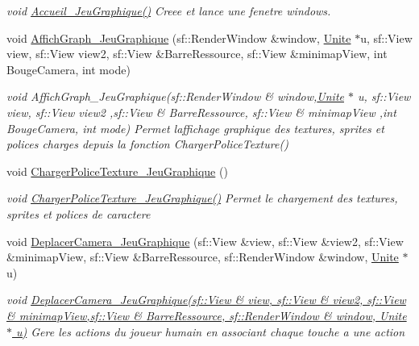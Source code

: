 \begin{DoxyCompactItemize}
\begin{DoxyCompactList}\small\item\em void \hyperlink{classJeu__graphique_a42894aac7cd7b37efe13ded6f47586de}{Accueil\+\_\+\+Jeu\+Graphique()} Creee et lance une fenetre windows. \end{DoxyCompactList}\item 
void \hyperlink{classJeu__graphique_a988f0ef9417b30872257d7b1396b6fc0}{Affich\+Graph\+\_\+\+Jeu\+Graphique} (sf\+::\+Render\+Window \&window, \hyperlink{classUnite}{Unite} $\ast$u, sf\+::\+View view, sf\+::\+View view2, sf\+::\+View \&Barre\+Ressource, sf\+::\+View \&minimap\+View, int Bouge\+Camera, int mode)
\begin{DoxyCompactList}\small\item\em void Affich\+Graph\+\_\+\+Jeu\+Graphique(sf\+::\+Render\+Window \& window,\hyperlink{classUnite}{Unite} $\ast$ u, sf\+::\+View view, sf\+::\+View view2 ,sf\+::\+View \& Barre\+Ressource, sf\+::\+View \& minimap\+View ,int Bouge\+Camera, int mode) Permet l\textquotesingle{}affichage graphique des textures, sprites et polices charges depuis la fonction Charger\+Police\+Texture() \end{DoxyCompactList}\item 
\mbox{\label{classJeu__graphique_a0957a1d27b8ded1fb4ac3fddca49d71c}} 
void \hyperlink{classJeu__graphique_a0957a1d27b8ded1fb4ac3fddca49d71c}{Charger\+Police\+Texture\+\_\+\+Jeu\+Graphique} ()
\begin{DoxyCompactList}\small\item\em void \hyperlink{classJeu__graphique_a0957a1d27b8ded1fb4ac3fddca49d71c}{Charger\+Police\+Texture\+\_\+\+Jeu\+Graphique()} Permet le chargement des textures, sprites et polices de caractere \end{DoxyCompactList}\item 
void \hyperlink{classJeu__graphique_abbcc5e26b8ac9f79716367883bfdb556}{Deplacer\+Camera\+\_\+\+Jeu\+Graphique} (sf\+::\+View \&view, sf\+::\+View \&view2, sf\+::\+View \&minimap\+View, sf\+::\+View \&Barre\+Ressource, sf\+::\+Render\+Window \&window, \hyperlink{classUnite}{Unite} $\ast$u)
\begin{DoxyCompactList}\small\item\em void \hyperlink{classJeu__graphique_abbcc5e26b8ac9f79716367883bfdb556}{Deplacer\+Camera\+\_\+\+Jeu\+Graphique(sf\+::\+View \& view, sf\+::\+View \& view2, sf\+::\+View \& minimap\+View,sf\+::\+View \& Barre\+Ressource, sf\+::\+Render\+Window \& window, Unite $\ast$ u)} Gere les actions du joueur humain en associant chaque touche a une action \end{DoxyCompactList}\item 

\end{DoxyCompactItemize}
